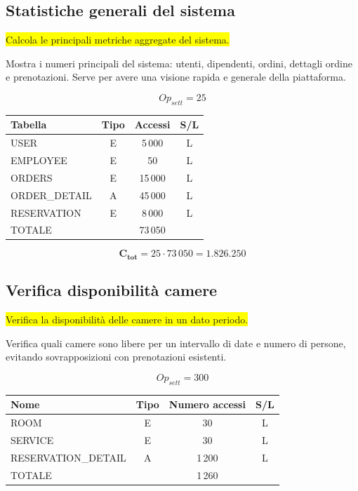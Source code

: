 \documentclass[a4paper,12pt]{report}
\begin{document}
\subsection*{Statistiche generali del sistema} \label{op6}
\colorbox{yellow}{Calcola le principali metriche aggregate del sistema.}

Mostra i numeri principali del sistema: utenti, dipendenti, ordini,
dettagli ordine e prenotazioni. Serve per avere una visione rapida e
generale della piattaforma.

$$Op_{sett} = 25$$

\begin{table}[H]
  \centering
  \small
  \renewcommand{\arraystretch}{1.15}
  \begin{tabularx}{0.9\textwidth}{|X|c|c|c|}
    \hline
    \rowcolor{gray!20}
    \textbf{Tabella} & \textbf{Tipo} & \textbf{Accessi} & \textbf{S/L} \\
    \hline
    USER & E & 5\,000 & L \\
    EMPLOYEE & E & 50 & L \\
    ORDERS & E & 15\,000 & L \\
    ORDER\_DETAIL & A & 45\,000 & L \\
    RESERVATION & E & 8\,000 & L \\
    \hline
    \rowcolor{gray!20}
    TOTALE & & 73\,050 & \\
    \hline
  \end{tabularx}
  \vspace{-1em}
\end{table}

$$\mathbf{C_{tot}} = 25 \cdot 73\,050 = \mathbf{1.826.250}$$

\subsection*{Verifica disponibilità camere} \label{op7}
\colorbox{yellow}{Verifica la disponibilità delle camere in un dato periodo.}

Verifica quali camere sono libere per un intervallo di date e numero
di persone, evitando sovrapposizioni con prenotazioni esistenti.

$$Op_{sett} = 300$$

\begin{table}[H]
  \centering
  \small
  \renewcommand{\arraystretch}{1.15}
  \begin{tabularx}{0.8\textwidth}{|X|c|c|c|}
    \hline
    \rowcolor{gray!20}
    \textbf{Nome} & \textbf{Tipo} & \textbf{Numero accessi} &
    \textbf{S/L} \\
    \hline
    ROOM & E & 30 & L \\
    SERVICE & E & 30 & L \\
    RESERVATION\_DETAIL & A & 1\,200 & L \\
    \hline
    \rowcolor{gray!20}
    TOTALE & & 1\,260 & \\
    \hline
  \end{tabularx}
  \vspace{-1em}
\end{table}
\end{document}
